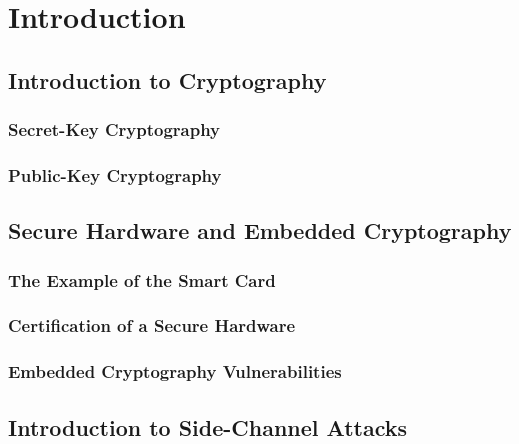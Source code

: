 
\chapter{Introduction} %

\label{ChapterIntroduction}


\section{Introduction to Cryptography}
\subsection{Secret-Key Cryptography}
\subsection{Public-Key Cryptography}


\section{Secure Hardware and Embedded Cryptography}
\subsection{The Example of the Smart Card}
\subsection{Certification of a Secure Hardware}
\subsection{Embedded Cryptography Vulnerabilities}


\section{Introduction to Side-Channel Attacks}
